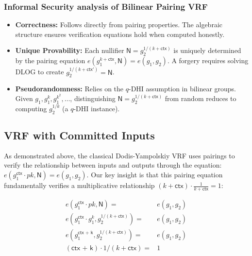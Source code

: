 \subsubsection{Informal Security analysis of Bilinear Pairing VRF}
\begin{itemize}
    \item \textbf{Correctness:} Follows directly from pairing properties. The algebraic structure ensures verification equations hold when computed honestly.
    
    \item \textbf{Unique Provability:} Each nullifier $\mathsf{N} = g_2^{1/(k+\textsf{ctx})}$ is uniquely determined by the pairing equation $e(g_1^{k + \textsf{ctx}}, \mathsf{N}) = e(g_1, g_2)$. A forgery requires solving DLOG to create  $g_2^{1/(k+\textsf{ctx}')} = \mathsf{N}$.
    
    \item \textbf{Pseudorandomness:} Relies on the $q$-DHI assumption in bilinear groups. Given $g_1, g_1^k, g_1^{k^2}, \ldots$, distinguishing $\mathsf{N} = g_2^{1/(k+\textsf{ctx})}$ from random reduces to computing $g_2^{1/k}$ (a $q$-DHI instance).
\end{itemize}



\subsection{VRF with Committed Inputs}
As demonstrated above, the classical Dodis-Yampolskiy VRF uses pairings to verify the relationship between inputs and outputs through the equation: $e(g_1^{\textsf{ctx}} \cdot pk, \mathsf{N}) = e(g_1, g_2)$. Our key insight is that this pairing equation fundamentally verifies a multiplicative relationship $(k + \textsf{ctx}) \cdot \frac{1}{k + \textsf{ctx}} = 1$:

\begin{align*}
    e(g_1^{\textsf{ctx}} \cdot pk, \mathsf{N}) =& e(g_1, g_2)    \\
    e(g_1^{\textsf{ctx}} \cdot g_1^k, g_2^{1/(k + \textsf{ctx})}) =& e(g_1, g_2) \\
    e(g_1^{\textsf{ctx + k}}, g_2^{1/(k + \textsf{ctx})}) =& e(g_1, g_2) \\
    (\textsf{ctx + k}) \cdot 1/(k + \textsf{ctx})  =& 1 \\
\end{align*}



